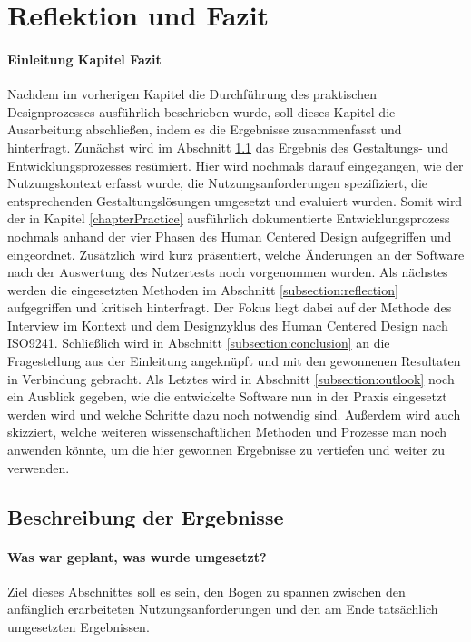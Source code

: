 \section{Reflektion und Fazit}
\paragraph{Einleitung Kapitel Fazit}

Nachdem im vorherigen Kapitel die Durchführung des praktischen Designprozesses
ausführlich beschrieben wurde, soll dieses Kapitel die Ausarbeitung
abschließen, indem es die Ergebnisse zusammenfasst und hinterfragt. Zunächst
wird im Abschnitt \ref{subsection:resultDescription} das Ergebnis des
Gestaltungs- und Entwicklungsprozesses resümiert. Hier wird nochmals darauf
eingegangen, wie der Nutzungskontext erfasst wurde, die Nutzungsanforderungen
spezifiziert, die entsprechenden Gestaltungslösungen umgesetzt und evaluiert
wurden. Somit wird der in Kapitel \ref{chapterPractice} ausführlich
dokumentierte Entwicklungsprozess nochmals anhand der vier Phasen des Human
Centered Design aufgegriffen und eingeordnet\cite{iso9241}. Zusätzlich wird
kurz präsentiert, welche Änderungen an der Software nach der Auswertung des
Nutzertests noch vorgenommen wurden. Als nächstes werden die eingesetzten
Methoden im Abschnitt \ref{subsection:reflection} aufgegriffen und kritisch
hinterfragt. Der Fokus liegt dabei auf der Methode des Interview im Kontext und
dem Designzyklus des Human Centered Design nach ISO9241. Schließlich wird in
Abschnitt \ref{subsection:conclusion} an die Fragestellung aus der Einleitung
angeknüpft und mit den gewonnenen Resultaten in Verbindung gebracht. Als
Letztes wird in Abschnitt \ref{subsection:outlook} noch ein Ausblick gegeben,
wie die entwickelte Software nun in der Praxis eingesetzt werden wird und
welche Schritte dazu noch notwendig sind. Außerdem wird auch skizziert, welche
weiteren wissenschaftlichen Methoden und Prozesse man noch anwenden könnte, um
die hier gewonnen Ergebnisse zu vertiefen und weiter zu verwenden.

\subsection{Beschreibung der Ergebnisse}
\label{subsection:resultDescription}

\paragraph{Was war geplant, was wurde umgesetzt?}
Ziel dieses Abschnittes soll es sein, den Bogen zu spannen zwischen den
anfänglich erarbeiteten Nutzungsanforderungen und den am Ende tatsächlich
umgesetzten Ergebnissen.

